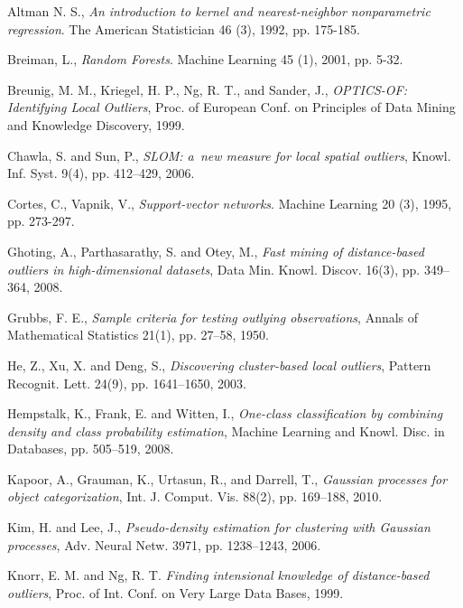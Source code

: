 \documentclass{llncs}
\begin{document}
\begin{thebibliography}{1}
	

Altman N. S., \emph{An introduction to kernel and nearest-neighbor nonparametric regression}. The American Statistician 46 (3), 1992, pp. 175-185.

Breiman, L., \emph{Random Forests}. Machine Learning 45 (1), 2001, pp. 5-32. 

Breunig, M. M., Kriegel, H. P., Ng, R. T., and Sander, J., \emph{OPTICS-OF: Identifying Local Outliers}, Proc. of European Conf. on Principles of Data Mining and Knowledge Discovery, 1999.

Chawla, S. and Sun, P., \emph{SLOM: a~new measure for local spatial outliers}, Knowl. Inf. Syst. 9(4), pp. 412--429, 2006.

Cortes, C., Vapnik, V., \emph{Support-vector networks}. Machine Learning 20 (3), 1995, pp. 273-297.

Ghoting, A., Parthasarathy, S. and Otey, M., \emph{Fast mining of distance-based outliers in high-dimensional datasets}, Data Min. Knowl. Discov. 16(3), pp. 349--364, 2008.

Grubbs, F. E., \emph{Sample criteria for testing outlying observations}, Annals of Mathematical Statistics 21(1), pp. 27--58, 1950. 

He, Z., Xu, X. and Deng, S., \emph{Discovering cluster-based local outliers}, Pattern Recognit. Lett. 24(9), pp. 1641--1650, 2003.

Hempstalk, K., Frank, E. and Witten, I., \emph{One-class classification by combining density and class probability estimation}, Machine Learning and Knowl. Disc. in Databases, pp. 505--519, 2008.

Kapoor, A., Grauman, K., Urtasun, R., and Darrell, T., \emph{Gaussian processes for object categorization}, Int. J. Comput. Vis. 88(2), pp. 169--188, 2010.

Kim, H. and Lee, J., \emph{Pseudo-density estimation for clustering with Gaussian processes}, Adv. Neural Netw. 3971, pp. 1238--1243, 2006.

Knorr, E. M. and Ng, R. T. \emph{Finding intensional knowledge of distance-based outliers}, Proc. of Int. Conf. on Very Large Data Bases, 1999.


\end{thebibliography}
\end{document}
